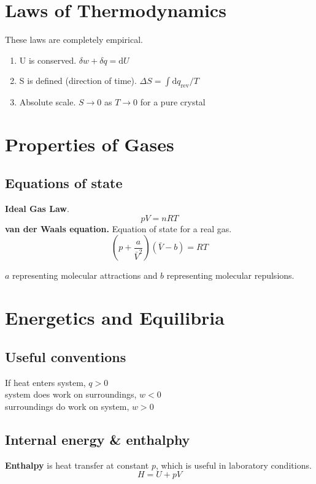 \section{Laws of Thermodynamics}
These laws are completely empirical.

\begin{enumerate}
    \item U is conserved. $\delta w + \delta q = \mathrm{d}U$
    \item S is defined (direction of time). $ \Delta S = \int \mathrm{d}q_{\mathrm{rev}} / T$
    \item Absolute scale. $S \rightarrow 0$ as $T \rightarrow 0$ for a pure crystal
\end{enumerate}

\section{Properties of Gases}
\subsection*{Equations of state}
\textbf{Ideal Gas Law}.
\begin{equation*}
    pV = nRT
\end{equation*}
\textbf{van der Waals equation.} Equation of state for a real gas.
$$\left(p + \frac{a}{\bar{V}^2}\right) \left(\bar{V} - b\right) = RT$$ 

$a$ representing molecular attractions and $b$ representing molecular repulsions.

\section{Energetics and Equilibria}
\subsection*{Useful conventions}
If heat enters system, $q > 0$\\
system does work on surroundings, $w < 0$\\
surroundings do work on system, $w > 0$

\subsection*{Internal energy \& enthalphy}
\textbf{Enthalpy} is heat transfer at constant $p$, which is useful in laboratory conditions.
\begin{equation*}
    H = U + pV
\end{equation*}


